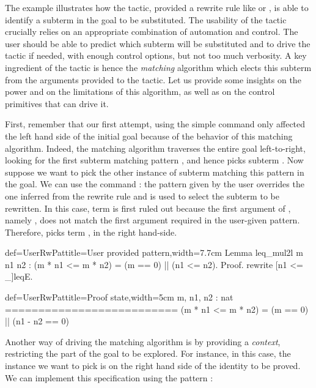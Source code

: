 \label{sec:rewrite2}

The example  illustrates how the  tactic, provided a
rewrite rule like  or , is able
to identify a
subterm in the goal to be substituted. The usability of the
tactic crucially relies on an appropriate combination of automation
and control. The user should be able to predict which subterm will be
substituted and to drive the tactic if needed, with enough control
options, but not too much verbosity. A key ingredient of the
 tactic is hence the \emph{matching} algorithm which
elects this subterm from the arguments provided to the tactic. Let us
provide some insights on the power and on the limitations of this
algorithm, as well as on the control primitives that can drive it.

First, remember that our first attempt, using the simple
 command only
affected the left hand side of the initial goal because of the
behavior of this matching algorithm.
Indeed, the matching algorithm traverses the entire goal
left-to-right, looking for the first subterm matching pattern
\C{(_ <= _)},  and hence picks subterm .
Now suppose we want to pick
the other instance of subterm matching this pattern in the goal. We
can use the command : the
pattern given by the user overrides the one inferred from the rewrite
rule and is used to select the subterm to be rewritten. In this case,
term  is first ruled out because the first argument of
\C{<=}, namely , does not match the first argument 
required in the user-given pattern. Therefore,  picks term
, in the right hand-side.

\begin{coq}{def=UserRwPat}{title=User provided pattern,width=7.7cm}
Lemma leq_mul2l m n1 n2 :
(m * n1 <= m * n2) = (m == 0) || (n1 <= n2).
Proof.
rewrite [n1 <= _]leqE.
\end{coq}
\begin{coqout}{def=UserRwPat}{title=Proof state,width=5cm}
m, n1, n2 : nat
==========================
(m * n1 <= m * n2) =
(m == 0) || (n1 - n2 == 0)
\end{coqout}

Another way of driving the matching algorithm is by providing a
\emph{context}, restricting the part of the goal to be explored. For
instance, in this case, the instance we want to pick is on
the right hand side of the identity to be proved. We can implement
this specification using the pattern \C{[in RHS]}:

